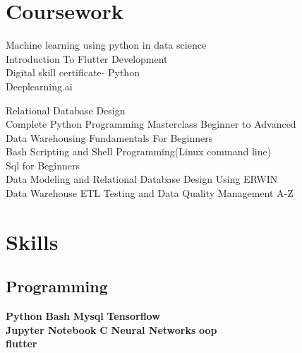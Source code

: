 \documentclass[]{deedy-resume-openfont}
\begin{document}
\begin{minipage}[t]{0.33\textwidth}
\sectionsep



\section{Coursework}

\textbullet{}Machine learning using python in data science \\
\textbullet{}Introduction To Flutter Development \\
\textbullet{}Digital skill certificate- Python \\
\textbullet{}Deeplearning.ai \\

\sectionsep


\textbullet{}Relational Database Design\\
\textbullet{}Complete Python Programming Masterclass Beginner to Advanced\\
\textbullet{}Data Warehousing Fundamentals For Beginners\\
\textbullet{}Bash Scripting and Shell Programming(Linux command line)\\
\textbullet{}Sql for Beginners\\
\textbullet{}Data Modeling and Relational Database Design Using ERWIN\\
\textbullet{}Data Warehouse ETL Testing and Data Quality Management A-Z\\


\section{Skills}
\subsection{Programming}

\textbullet{} \textbf{Python} \textbullet{}   \textbf{Bash} \textbullet{} \textbf{Mysql} \textbullet{} \textbf{Tensorflow} \\ \textbullet{} 
\textbf{Jupyter Notebook} \textbullet{} \textbf{C} \textbullet{} \textbf{Neural Networks} \textbullet{} \textbf{oop}  \\ 
\textbullet{} 
\textbf{flutter }
\sectionsep

%
%

\end{minipage} 
\end{document}

